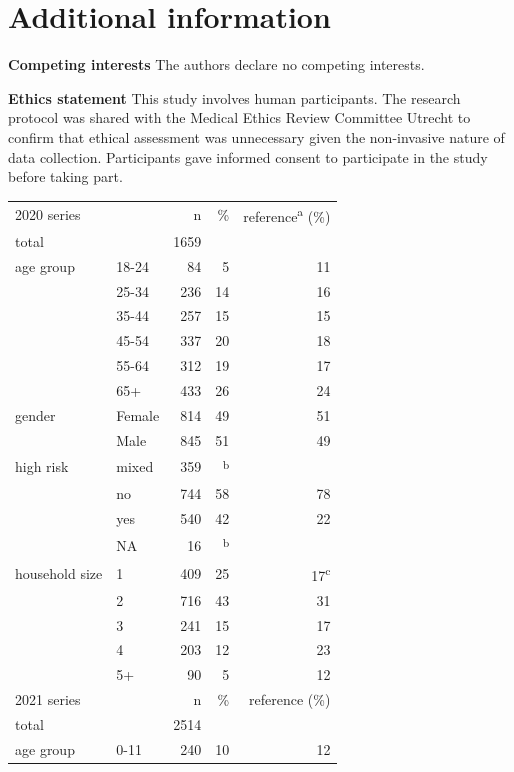 \documentclass[fleqn,10pt]{wlscirep}
\begin{document}
\section*{Additional information}

\textbf{Competing interests} The authors declare no competing interests.

\noindent \textbf{Ethics statement} This study involves human participants. The research protocol was shared with the Medical Ethics Review Committee Utrecht to confirm that ethical assessment was unnecessary given the non-invasive nature of data collection. Participants gave informed consent to participate in the study before taking part.

\clearpage

\begin{table}[ht]
\centering
\begin{tabular}{llrrr}
  \hline
  \hline
  2020 series & & n & \% & reference\textsuperscript{a} (\%) \\ 
  total & & 1659 & & \\
  \hline
  age group & 18-24 & 84 & 5 & 11 \\ 
   & 25-34 & 236 & 14 & 16 \\ 
   & 35-44 & 257 & 15 & 15 \\ 
   & 45-54 & 337 & 20 & 18 \\ 
   & 55-64 & 312 & 19 & 17 \\ 
   & 65+ & 433 & 26 & 24 \\ 
  \hline
  gender & Female & 814 & 49 & 51 \\ 
   & Male & 845 & 51 & 49 \\ 
  \hline
  high risk & mixed & 359 & \textsuperscript{b} &  \\ 
   & no & 744 & 58 & 78 \\ 
   & yes & 540 & 42 & 22 \\ 
   & NA & 16 & \textsuperscript{b} &  \\ 
  \hline
  household size & 1 & 409 & 25 & 17\textsuperscript{c} \\ 
   & 2 & 716 & 43 & 31 \\ 
   & 3 & 241 & 15 & 17 \\ 
   & 4 & 203 & 12 & 23 \\ 
   & 5+ & 90 & 5 & 12 \\ 
  \hline
  \hline
  2021 series & & n & \% & reference (\%) \\ 
  total & & 2514 & & \\
  \hline
  age group & 0-11 & 240 & 10 & 12 \\ 

\end{tabular}
\end{table}
\end{document}
